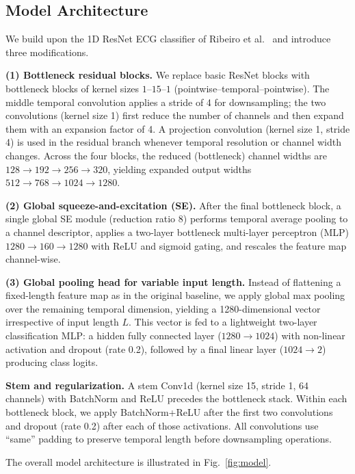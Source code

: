 \subsection{Model Architecture}
\label{subsec:model}


We build upon the 1D ResNet ECG classifier of Ribeiro et al.~\cite{ribeiro2020automatic} and introduce three modifications.

\textbf{(1) Bottleneck residual blocks.} We replace basic ResNet blocks with bottleneck blocks of kernel sizes $1$–$15$–$1$ (pointwise--temporal--pointwise). The middle temporal convolution applies a stride of 4 for downsampling; the two convolutions (kernel size 1) first reduce the number of channels and then expand them with an expansion factor of 4. A projection convolution (kernel size 1, stride 4) is used in the residual branch whenever temporal resolution or channel width changes. Across the four blocks, the reduced (bottleneck) channel widths are $128 \to 192 \to 256 \to 320$, yielding expanded output widths $512 \to 768 \to 1024 \to 1280$.

\textbf{(2) Global squeeze-and-excitation (SE).} After the final bottleneck block, a single global SE module (reduction ratio 8) \cite{hu2018senet} performs temporal average pooling to a channel descriptor, applies a two-layer bottleneck multi-layer perceptron (MLP) $1280 \to 160 \to 1280$ with ReLU and sigmoid gating, and rescales the feature map channel-wise.

\textbf{(3) Global pooling head for variable input length.} Instead of flattening a fixed-length feature map as in the original baseline, we apply global max pooling over the remaining temporal dimension, yielding a 1280-dimensional vector irrespective of input length $L$. This vector is fed to a lightweight two-layer classification MLP: a hidden fully connected layer ($1280 \to 1024$) with non-linear activation and dropout (rate 0.2), followed by a final linear layer ($1024 \to 2$) producing class logits.

\textbf{Stem and regularization.} A stem Conv1d (kernel size 15, stride 1, 64 channels) with BatchNorm and ReLU precedes the bottleneck stack. Within each bottleneck block, we apply BatchNorm+ReLU after the first two convolutions and dropout (rate 0.2) after each of those activations. All convolutions use “same” padding to preserve temporal length before downsampling operations.

The overall model architecture is illustrated in Fig.~\ref{fig:model}.


